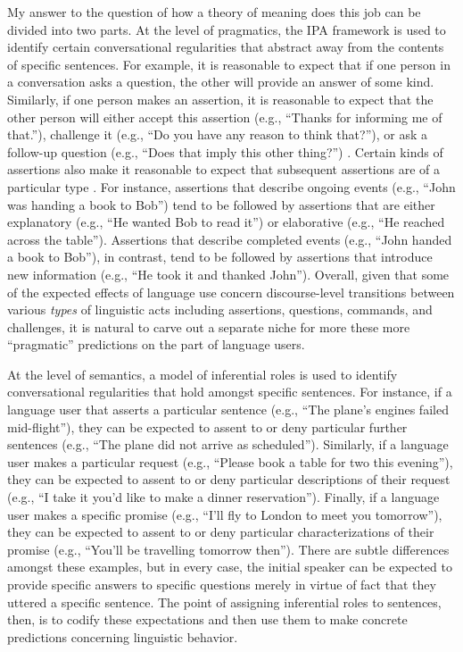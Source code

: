 My answer to the question of how a theory of meaning does this job can be divided into two parts. At the level of pragmatics, the IPA framework is used to identify certain conversational regularities that abstract away from the contents of specific sentences. For example, it is reasonable to expect that if one person in a conversation asks a question, the other will provide an answer of some kind. Similarly, if one person makes an assertion, it is reasonable to expect that the other person will either accept this assertion (e.g., ``Thanks for informing me of that.''), challenge it (e.g., ``Do you have any reason to think that?''), or ask a follow-up question (e.g., ``Does that imply this other thing?'') \citep{Brandom:1994}. Certain kinds of assertions also make it reasonable to expect that subsequent assertions are of a particular type \citep{Rohde:2008}. For instance, assertions that describe ongoing events (e.g., ``John was handing a book to Bob'') tend to be followed by assertions that are either explanatory (e.g., ``He wanted Bob to read it'') or elaborative (e.g., ``He reached across the table''). Assertions that describe completed events (e.g., ``John handed a book to Bob''), in contrast, tend to be followed by assertions that introduce new information (e.g., ``He took it and thanked John''). Overall, given that some of the expected effects of language use concern discourse-level transitions between various \textit{types} of linguistic acts including assertions, questions, commands, and challenges, it is natural to carve out a separate niche for more these more ``pragmatic'' predictions on the part of language users. 

At the level of semantics, a model of inferential roles is used to identify conversational regularities that hold amongst specific sentences. For instance, if a language user that asserts a particular sentence (e.g., ``The plane's engines failed mid-flight''), they can be expected to assent to or deny particular further sentences (e.g., ``The plane did not arrive as scheduled''). Similarly, if a language user makes a particular request (e.g., ``Please book a table for two this evening''), they can be expected to assent to or deny particular descriptions of their request (e.g., ``I take it you'd like to make a dinner reservation''). Finally, if a language user makes a specific promise (e.g., ``I'll fly to London to meet you tomorrow''), they can be expected to assent to or deny particular characterizations of their promise (e.g., ``You'll be travelling tomorrow then''). There are subtle differences amongst these examples, but in every case, the initial speaker can be expected to provide specific answers to specific questions merely in virtue of fact that they uttered a specific sentence. The point of assigning inferential roles to sentences, then, is to codify these expectations and then use them to make concrete predictions concerning linguistic behavior. 

